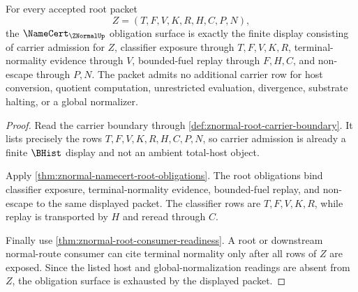 \begin{theorem}
\label{thm:znormal-namecert-obligation-surface}
For every accepted root packet
$$
Z=(T,F,V,K,R,H,C,P,N),
$$
the $\NameCert_{\ZNormalUp}$ obligation surface is exactly the finite display consisting of carrier admission for $Z$, classifier exposure through $T,F,V,K,R$, terminal-normality evidence through $V$, bounded-fuel replay through $F,H,C$, and non-escape through $P,N$. The packet admits no additional carrier row for host conversion, quotient computation, unrestricted evaluation, divergence, substrate halting, or a global normalizer.
\end{theorem}
\begin{proof}
Read the carrier boundary through \autoref{def:znormal-root-carrier-boundary}. It lists precisely the rows $T,F,V,K,R,H,C,P,N$, so carrier admission is already a finite $\BHist$ display and not an ambient total-host object.

Apply \autoref{thm:znormal-namecert-root-obligations}. The root obligations bind classifier exposure, terminal-normality evidence, bounded-fuel replay, and non-escape to the same displayed packet. The classifier rows are $T,F,V,K,R$, while replay is transported by $H$ and reread through $C$.

Finally use \autoref{thm:znormal-root-consumer-readiness}. A root or downstream normal-route consumer can cite terminal normality only after all rows of $Z$ are exposed. Since the listed host and global-normalization readings are absent from $Z$, the obligation surface is exhausted by the displayed packet.
\end{proof}

